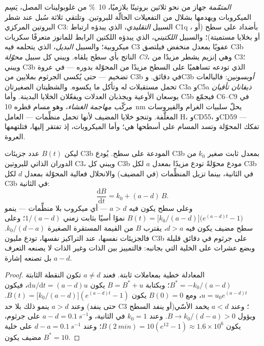\begin{definition}[المتمّمة]\label{def:b3:innate-immunity:complement}
\emph{المتمّمة} جهاز من نحو ثلاثين بروتينًا بلازميًا،
\qty{10}{\%} من غلوبولينات المصل، يَسِم الميكروبات ويهدمها
بشلال من التفعيلات الحالّة للبروتين. وتلتقي ثلاثة سُبل عند
شطر البروتين المركزي C3: السبيل \emph{التقليدي}، الذي يبدؤه
ارتباط C1q بأضداد على سطح (أو ، أو
بخلايا مستميتة)؛ والسبيل \emph{اللكتيني}، الذي يبدؤه
اللكتين الرابط للمانوز متعرفًا سكريات ميكروبية؛ والسبيل
\emph{البديل}، الذي يتحلمه فيه C3 عفويًا بمعدل منخفض فيلتصق
C3b الناتج بأي سطح يلقاه. ويبني كل سبيل \emph{محوّلة C3}،
وهي إنزيم يشطر مزيدًا من C3؛ ويبني C3b الذي تودعه تساهميًا
على السطح مزيدًا من المحوّلة بدوره --- في عروة تضخيم ---
حتى يُكسى الجرثوم بملايين من C3b في دقائق. وC3b
\emph{أوبسونين}: فالبالعات تحمل مستقبلات له وتأكل ما يكسوه.
والشظيتان الصغيرتان C3a وC5a \emph{ذيفانان تأقيان} يوسعان
الأوعية ويجذبان العدلات ويفعّلان الخلايا البدينة. وأما C5b
فيجمّع C6--C9 في \emph{مركّب مهاجمة الغشاء}، وهو مسام قطره
\qty{10}{nm} يحلّ سلبيات الغرام والفيروسات المغلَّفة. وتنجو
خلايا المضيف لأنها تحمل منظِّمات --- العامل H، وCD55، وCD59
--- تفكك المحوّلة وتسد المسام على أسطحها هي؛ وأما
الميكروبات، إذ تفتقر إليها، فتلتهمها العروة.
\end{definition}

\begin{theorem}\label{thm:b3:innate-immunity:complement}
ليكن $B(t)$ عدد جزيئات C3b المودعة على سطح. يُودع C3b بمعدل
ثابت صغير $k_{0}$ من الدوران الذاتي للبروتين
C3، ويبني كل C3b مودع محوّلةً تودع مزيدًا بمعدل
$a$ لكل C3b في الثانية، بينما تزيل المنظِّمات (في المضيف)
والانحلال فعالية المحوّلة بمعدل $d$ لكل C3b في الثانية:
\[
\frac{\mathrm{d}B}{\mathrm{d}t} = k_{0} + (a - d)\,B .
\]
وعلى سطح يكون فيه $a > d$ --- أي ميكروب بلا منظِّمات ---
ينمو $B(t) = \bigl[k_{0}/(a-d)\bigr]\bigl(e^{(a-d)t} - 1\bigr)$
نموًا أسيًا بثابت زمني $1/(a - d)$؛ وعلى سطح مضيف يكون فيه
$d > a$، يقترب $B$ من القيمة المستقرة الصغيرة $k_{0}/(d - a)$.
فالجزيئات نفسها، عند التراكيز نفسها، تودع مليون C3b على
جرثوم في دقائق قليلة وبضع عشرات على الخلية التي بجانبه:
فالتمييز بين الذات وغير الذات لا يصنعه التعرف بل تصنعه
إشارة $a - d$.
\end{theorem}
\begin{proof}
المعادلة خطية بمعاملات ثابتة. فعند $a \ne d$ تكون النقطة
الثابتة $B^{*} = -k_{0}/(a-d)$؛ وبكتابة $B = B^{*} + u$ يكون
$\mathrm{d}u/\mathrm{d}t = (a-d)u$، فيكون $u = u_{0}e^{(a-d)t}$، ومع
$B(0) = 0$ يكون $B(t) = \bigl[k_{0}/(a-d)\bigr](e^{(a-d)t} - 1)$. وعند $a > d$
ينمو ذلك بلا حد (حتى ينفد C3 أو ينفد السطح)؛ وعند $a < d$
يخمد الأسّي ويؤول $B \to k_{0}/(d-a) > 0$. وعند $k_{0} = 1$
في الثانية، و$a - d = \qty{0.1}{s^{-1}}$ على جرثوم، يكون $B(\qty{2}{min})
= 10(e^{12} - 1) \approx 1.6\times 10^{6}$؛ وعند $d - a =
\qty{0.1}{s^{-1}}$ على خلية مضيف يكون $B^{*} = 10$.
\end{proof}

